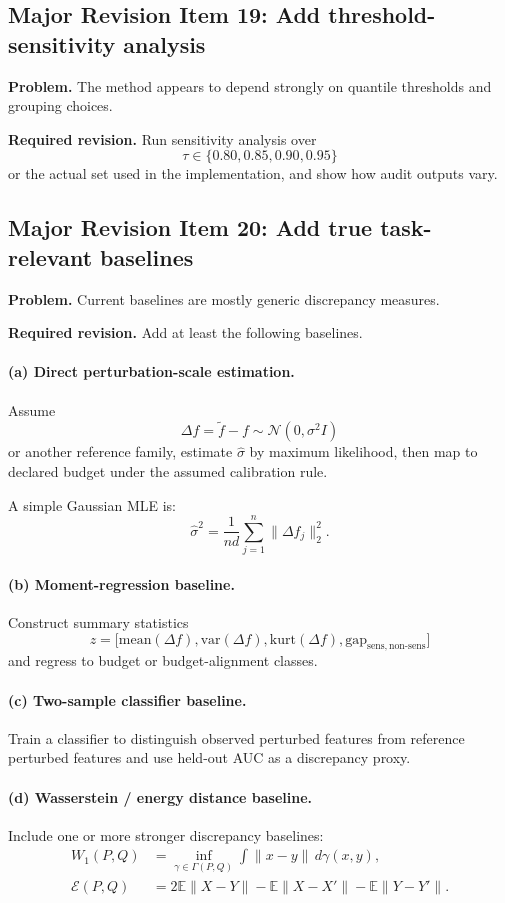\subsection*{Major Revision Item 19: Add threshold-sensitivity analysis}
\textbf{Problem.} The method appears to depend strongly on quantile thresholds and grouping choices.

\textbf{Required revision.}
Run sensitivity analysis over
\[
\tau \in \{0.80, 0.85, 0.90, 0.95\}
\]
or the actual set used in the implementation, and show how audit outputs vary.

\subsection*{Major Revision Item 20: Add true task-relevant baselines}
\textbf{Problem.} Current baselines are mostly generic discrepancy measures.

\textbf{Required revision.}
Add at least the following baselines.

\paragraph{(a) Direct perturbation-scale estimation.}
Assume
\[
\Delta f = \tilde{f} - f \sim \mathcal{N}(0,\sigma^2 I)
\]
or another reference family, estimate $\hat{\sigma}$ by maximum likelihood, then map to declared budget under the assumed calibration rule.

A simple Gaussian MLE is:
\[
\hat{\sigma}^2
=
\frac{1}{nd}
\sum_{j=1}^{n}
\|\Delta f_j\|_2^2.
\]

\paragraph{(b) Moment-regression baseline.}
Construct summary statistics
\[
z =
\bigl[
\mathrm{mean}(\Delta f),
\mathrm{var}(\Delta f),
\mathrm{kurt}(\Delta f),
\mathrm{gap}_{\mathrm{sens,non\mbox{-}sens}}
\bigr]
\]
and regress to budget or budget-alignment classes.

\paragraph{(c) Two-sample classifier baseline.}
Train a classifier to distinguish observed perturbed features from reference perturbed features and use held-out AUC as a discrepancy proxy.

\paragraph{(d) Wasserstein / energy distance baseline.}
Include one or more stronger discrepancy baselines:
\begin{align}
W_1(P,Q)
&=
\inf_{\gamma \in \Gamma(P,Q)}
\int \|x-y\| \, d\gamma(x,y), \\
\mathcal{E}(P,Q)
&=
2\mathbb{E}\|X-Y\|
-
\mathbb{E}\|X-X'\|
-
\mathbb{E}\|Y-Y'\|.
\end{align}

